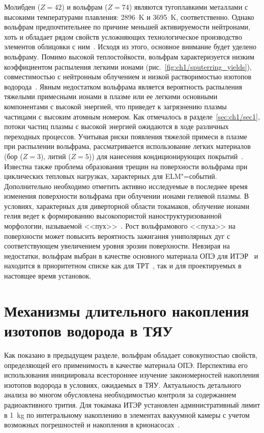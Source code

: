 Молибден ($Z=42$) и вольфрам ($Z=74$) являются тугоплавкими металлами с высокими температурами плавления: \SI{2896}{\kelvin} и \SI{3695}{\kelvin}, соответственно. Однако вольфрам предпочтительнее по причине меньшей активируемости нейтронами, хоть и обладает рядом свойств усложняющих технологическое производство элементов облицовки с ним~\cite{Piskarev2024}. Исходя из этого, основное внимание будет уделено вольфраму. Помимо высокой теплостойкости, вольфрам характеризуется низким коэффициентом распыления легкими ионами (рис.~\cref{fig:ch1/sputerring_yields}), совместимостью с нейтронным облучением и низкой растворимостью изотопов водорода~\cite{Roth2011, Pintsuk2012,Rieth2019}. Явным недостатком вольфрама является вероятность распыления тяжелыми примесными ионами в плазме или ее легкими основными компонентами с высокой энергией, что приведет к загрязнению плазмы частицами с высоким атомным номером. Как отмечалось в разделе~\cref{sec:ch1/sec1}, потоки частиц плазмы с высокой энергией ожидаются в ходе различных переходных процессов. Учитывая риски появления тяжелой примеси в плазме при распылении вольфрама, рассматривается использование легких материалов (бор ($Z=3$), литий ($Z=5$)) для нанесения кондиционирующих покрытий~\cite{Winter1996,Wauters2020}. Известна также проблема образования трещин на поверхности вольфрама при циклических тепловых нагрузках, характерных для ELM"=событий. Дополнительно необходимо отметить активно исследуемые в последнее время изменения поверхности вольфрама при облучении ионами гелиевой плазмы. В условиях, характерных для диверторной области токамаков, облучение ионами гелия ведет к формированию высокопористой наноструктуризованной морфологии, называемой <<пух>>~\cite{Ueda2018,Kajita2018,Fedorovich2019}. Рост вольфрамового <<пуха>> на поверхности может повысить вероятность зажигания униполярных дуг с соответствующем увеличением уровня эрозии поверхности. Невзирая на недостатки, вольфрам выбран в качестве основного материала ОПЭ для ИТЭР~\cite{Pitts2025} и находится в приоритетном списке как для ТРТ~\cite{Piskarev2024}, так и для проектируемых в настоящее время установок. 

\section{Механизмы длительного накопления изотопов водорода в ТЯУ}\label{sec:ch1/sec3}
Как показано в предыдущем разделе, вольфрам обладает совокупностью свойств, определяющей его применимость в качестве материала ОПЭ. Перспектива его использования инициировала всестороннее изучение закономерностей накопления изотопов водорода в условиях, ожидаемых в ТЯУ. Актуальность детального анализа во многом обусловлена необходимостью контроля за содержанием радиоактивного трития. Для токамака ИТЭР установлен административный лимит в \SI{1}{\kilogram} по интегральному накоплению в элементах вакуумной камеры с учетом возможных погрешностей и накопления в крионасосах~\cite{Roth1}.

